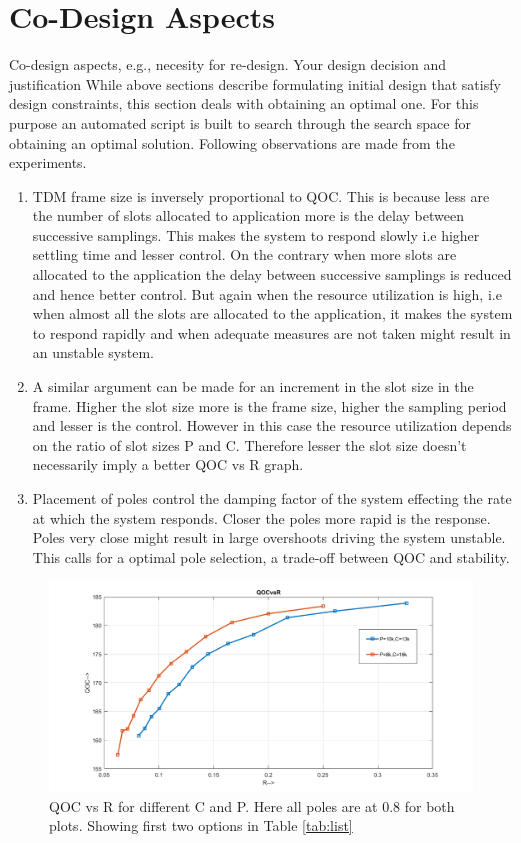 \section{Co-Design Aspects}
\label{sec:codesign}
\color{red}
Co-design	aspects,	e.g.,	necesity for	re-design.	Your	design	decision	and	justification
\color{black}
While above sections describe formulating initial design that satisfy design constraints, this section deals with obtaining an optimal one. For this purpose an automated script is built to search through the search space for obtaining an optimal solution. Following observations are made from the experiments.

\begin{enumerate}
	\item TDM frame size is inversely proportional to QOC. This is because less are the number of slots allocated to application more is the delay between successive samplings. This makes the system to respond slowly i.e higher settling time and lesser control. On the contrary when more slots are allocated to the application the delay between successive samplings is reduced and hence better control. But again when the resource utilization is high, i.e when almost all the slots are allocated to the application, it makes the system to respond rapidly and when adequate measures are not taken might result in an unstable system.
	
	\item A similar argument can be made for an increment in the slot size in the frame. Higher the slot size more is the frame size, higher the sampling period and lesser is the control. However in this case the resource utilization depends on the ratio of slot sizes P and C. Therefore lesser the slot size  doesn't necessarily imply a better QOC vs R graph.
	
	\item Placement of poles control the damping factor of the system effecting the rate at which the system responds. Closer the poles more rapid is the response. Poles very close might result in large overshoots driving the system unstable. This calls for a optimal pole selection, a trade-off between QOC and stability.
\end{enumerate}

\begin{figure}[h]
	\begin{center}
		\includegraphics[width=\linewidth]{img/qoc2}
		\caption{QOC vs R for different C and P. Here all poles are at 0.8 for both plots. Showing first two options in Table \ref{tab:list}}
		\label{fig:qoc2}
	\end{center}
\end{figure}